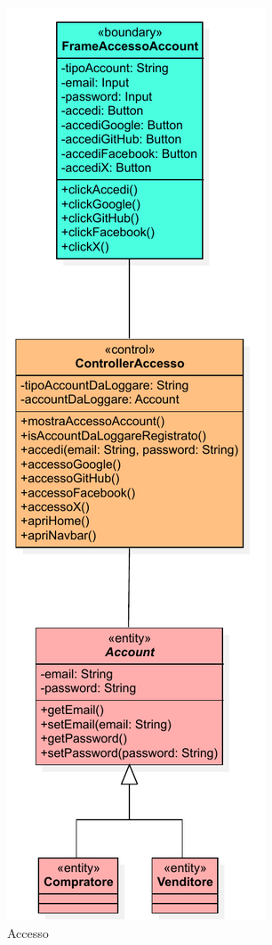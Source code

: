             \begin{figure}[htbp!]
                \centering
                    \includegraphics[width=0.35\linewidth]{Immagini/Diagrammi/Class Diagram/Utente che non ha effettuato l'accesso/Accesso.pdf}
                \caption{Accesso}
            \end{figure}
            
